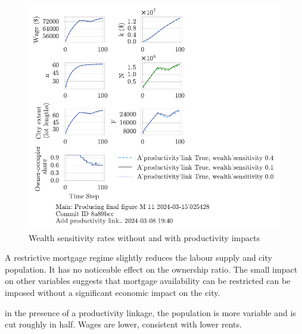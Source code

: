 \begin{figure}[h!tb]
    \includegraphics[scale=.75, trim={0 1.4cm 4.75cm 0},clip]{fig/With-productivity_link-wealth_sensitivity-025428.pdf} 
    \caption{Wealth sensitivity rates without and with productivity impacts}
    \label{fig:Productivity_link_W-WO-wealth}
\end{figure}
A restrictive mortgage regime slightly reduces the labour supply and city population. It has no noticeable effect on the ownership ratio. The small impact on other variables suggests that mortgage availability can be restricted can be imposed without a significant economic impact on the city. 

in the presence of a productivity linkage, the population is more variable and is cut roughly in half. Wages are lower, consistent with lower rents.

\newpage
